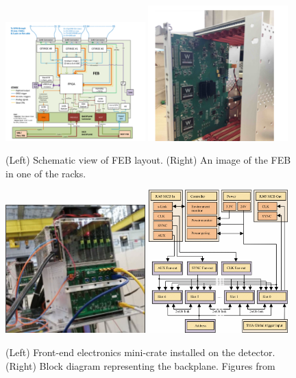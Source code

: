 \begin{figure}[h!]
	\centering
\includegraphics[width=0.48\textwidth]{figures/FEB.png}
\includegraphics[width=0.48\textwidth]{figures/FEB2.png}
\caption{(Left) Schematic view of FEB layout. (Right) An image of the FEB in one of the racks.}
\label{fig:FEB}
\end{figure}

\begin{figure}[h!]
\centering
\includegraphics[width=0.48\textwidth]{figures/crateInstalled.png}
\includegraphics[width=0.48\textwidth]{figures/backplane.png}
\caption{(Left) Front-end electronics mini-crate installed on the detector. (Right) Block diagram representing the backplane. Figures from \cite{52Georgi}}
\label{fig:crate}
\end{figure}


